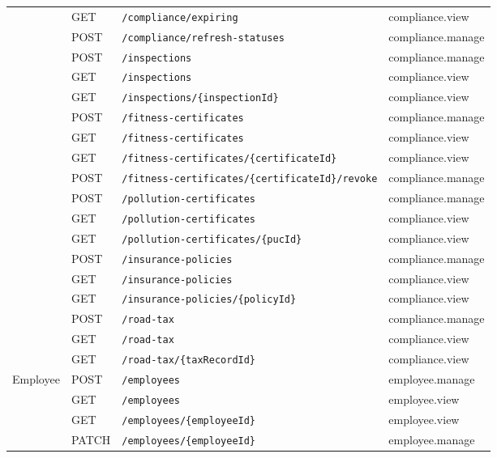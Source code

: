 \begin{longtable}{@{}p{2.1cm}l p{6.6cm} p{3.2cm}@{}}
 & GET & \texttt{/\allowbreak{}compliance/\allowbreak{}expiring} & compliance.view \\
 & POST & \texttt{/\allowbreak{}compliance/\allowbreak{}refresh-statuses} & compliance.manage \\
 & POST & \texttt{/\allowbreak{}inspections} & compliance.manage \\
 & GET & \texttt{/\allowbreak{}inspections} & compliance.view \\
 & GET & \texttt{/\allowbreak{}inspections/\allowbreak{}\{inspectionId\}} & compliance.view \\
 & POST & \texttt{/\allowbreak{}fitness-certificates} & compliance.manage \\
 & GET & \texttt{/\allowbreak{}fitness-certificates} & compliance.view \\
 & GET & \texttt{/\allowbreak{}fitness-certificates/\allowbreak{}\{certificateId\}} & compliance.view \\
 & POST & \texttt{/\allowbreak{}fitness-certificates/\allowbreak{}\{certificateId\}/\allowbreak{}revoke} & compliance.manage \\
 & POST & \texttt{/\allowbreak{}pollution-certificates} & compliance.manage \\
 & GET & \texttt{/\allowbreak{}pollution-certificates} & compliance.view \\
 & GET & \texttt{/\allowbreak{}pollution-certificates/\allowbreak{}\{pucId\}} & compliance.view \\
 & POST & \texttt{/\allowbreak{}insurance-policies} & compliance.manage \\
 & GET & \texttt{/\allowbreak{}insurance-policies} & compliance.view \\
 & GET & \texttt{/\allowbreak{}insurance-policies/\allowbreak{}\{policyId\}} & compliance.view \\
 & POST & \texttt{/\allowbreak{}road-tax} & compliance.manage \\
 & GET & \texttt{/\allowbreak{}road-tax} & compliance.view \\
 & GET & \texttt{/\allowbreak{}road-tax/\allowbreak{}\{taxRecordId\}} & compliance.view \\
Employee & POST & \texttt{/\allowbreak{}employees} & employee.manage \\
 & GET & \texttt{/\allowbreak{}employees} & employee.view \\
 & GET & \texttt{/\allowbreak{}employees/\allowbreak{}\{employeeId\}} & employee.view \\
 & PATCH & \texttt{/\allowbreak{}employees/\allowbreak{}\{employeeId\}} & employee.manage \\

\end{longtable}
